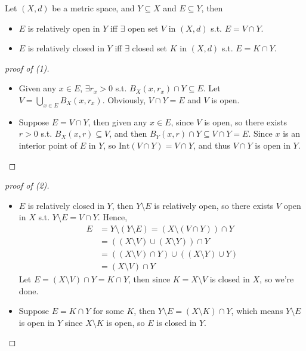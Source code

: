 \begin{proposition}
    Let \((X, d)\) be a metric space, and \(Y \subseteq X\) and \(E \subseteq Y\), then 
    \begin{itemize}
        \item [(1)] \(E\) is relatively open in \(Y\) iff \(\exists \) open set \(V\) in \((X, d)\) s.t. \(E = V \cap Y\).      
        \item [(2)] \(E\) is relatively closed in \(Y\) iff \(\exists \) closed set \(K\) in \((X, d)\) s.t. \(E = K \cap Y\).     
    \end{itemize}   
\end{proposition}
\begin{proof}[proof of (1)]
    \vphantom{text}
    \begin{itemize}
        \item [\((\implies )\)] Given any \(x \in E\), \(\exists r_x > 0\) s.t. \(B_X(x, r_x) \cap Y \subseteq E\). Let \(V = \bigcup_{x \in E} B_X(x, r_x) \). Obviously, \(V \cap Y = E\) and \(V\) is open.    
        \item [\((\impliedby )\)] Suppose \(E = V \cap Y\), then given any \(x \in E\), since \(V\) is open, so there exists \(r > 0\) s.t. \(B_X(x, r) \subseteq V\), and then \(B_Y(x, r) \cap Y \subseteq V \cap Y = E\). Since \(x\) is an interior point of \(E\) in \(Y\), so \(\mathrm{Int}(V \cap Y) = V \cap Y\), and thus \(V \cap Y\) is open in \(Y\).             
    \end{itemize}
\end{proof}
\begin{proof}[proof of (2)]
    \vphantom{text}
    \begin{itemize}
        \item [\((\implies )\)] \(E\) is relatively closed in \(Y\), then \(Y \setminus E\) is relatively open, so there exists \(V\) open in \(X\) s.t. \(Y \setminus E = V \cap Y\). Hence,
        \begin{align*}
            E &= Y \setminus (Y \setminus E) = \left( X \setminus (V \cap Y) \right) \cap Y \\
            &= \left( (X \setminus V) \cup (X \setminus Y) \right) \cap Y \\
            &= ((X \setminus V) \cap Y ) \cup ((X \setminus Y) \cup Y) \\
            &= (X \setminus V) \cap Y
        \end{align*}
        Let \(E = (X \setminus V) \cap Y = K \cap Y\), then since \(K = X \setminus V\) is closed in \(X\), so we're done.   
        \item [\((\impliedby )\)] Suppose \(E = K \cap Y\) for some \(K\), then \(Y \setminus E = (X \setminus K) \cap Y\), which means \(Y \setminus E\) is open in \(Y\) since \(X \setminus K\) is open, so \(E\) is closed in \(Y\).        
    \end{itemize}
\end{proof}

